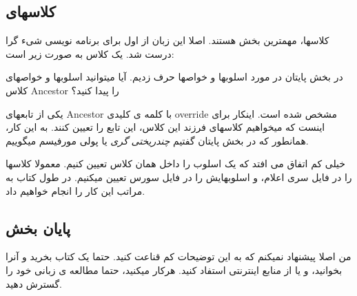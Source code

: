 \documentclass[14pt,a4paper]{memoir}
\begin{document}
	\subsection{کلاسهای }\label{cppclasses} 
	 
	 کلاسها، مهمترین بخش  هستند. اصلا این زبان از اول برای برنامه نویسی شیء گرا درست شد. یک کلاس به صورت زیر است:
	 
	 
	 
	 
	 
	 
	 
	 		  	 	 \begin{latin}
	 	
	 \end{latin} 
	 
	 
	 
در بخش پایتان در مورد اسلوبها و خواصها حرف زدیم. آیا میتوانید اسلوبها و خواصهای کلاس Ancestor را پیدا کنید؟

یکی از تابعهای Ancestor با کلمه ی کلیدی override مشخص شده است. اینکار برای اینست که میخواهیم کلاسهای فرزند این کلاس، این تابع را تعیین کنند. به این کار، همانطور که در بخش پایتان گفتیم \textit{چندریختی گری} یا پولی مورفیسم میگوییم.

خیلی کم اتفاق می افتد که یک اسلوب را داخل همان کلاس تعیین کنیم. معمولا کلاسها را در فایل سری اعلام، و اسلوبهایش را در فایل سورس تعیین میکنیم. در طول کتاب به مراتب این کار را انجام خواهیم داد.


	 
	 
	 
	 \subsection{پایان بخش }
	 
	من اصلا پیشنهاد نمیکنم که به این توضیحات کم قناعت کنید. حتما یک کتاب بخرید و آنرا بخوانید، و یا از منابع اینترنتی استفاد کنید. هرکار میکنید، حتما مطالعه ی زبانی خود را گسترش دهید.
	
\end{document}
